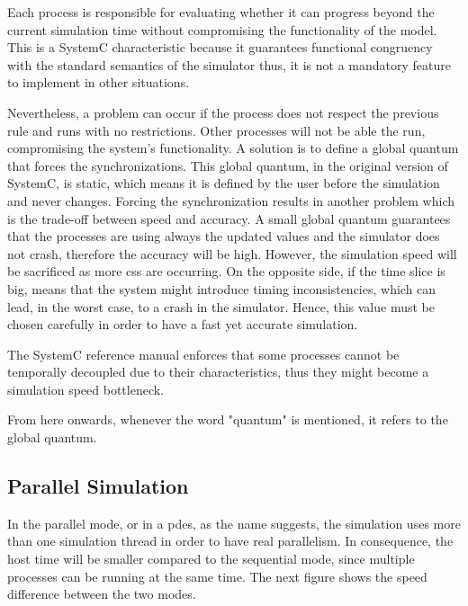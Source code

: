 Each process is responsible for evaluating whether it can progress beyond the current simulation time without compromising the functionality 
of the model. This is a SystemC characteristic because it guarantees functional congruency with the standard semantics of the simulator thus, 
it is not a mandatory feature to implement in other situations. 

Nevertheless, a problem can occur if the process does not respect the previous rule and runs with no restrictions. Other processes will not be 
able the run, compromising the system's functionality. A solution is to define a global quantum that forces the synchronizations. This global 
quantum, in the original version of SystemC, is static, which means it is defined by the user before the simulation and never changes. Forcing 
the synchronization results in another problem which is the trade-off between speed and accuracy. A small global quantum guarantees that the 
processes are using always the updated values and the simulator does not crash, therefore the accuracy will be high. However, the simulation 
speed will be sacrificed as more \glspl{cs} are occurring. On the opposite side, if the time slice is big, means that the system might introduce 
timing inconsistencies, which can lead, in the worst case, to a crash in the simulator. Hence, this value must be chosen carefully in order to 
have a fast yet accurate simulation.  

The SystemC reference manual \cite{systemC} enforces that some processes cannot be temporally decoupled due to their characteristics, thus 
they might become a simulation speed bottleneck. 

From here onwards, whenever the word "quantum" is mentioned, it refers to the global quantum.

\subsection{Parallel Simulation}

In the parallel mode, or in a \gls{pdes}, as the name suggests, the simulation uses more than one simulation thread in order to have real 
parallelism. In consequence, the host time will be smaller compared to the sequential mode, since multiple processes can be running at the 
same time. The next figure shows the speed difference between the two modes.

